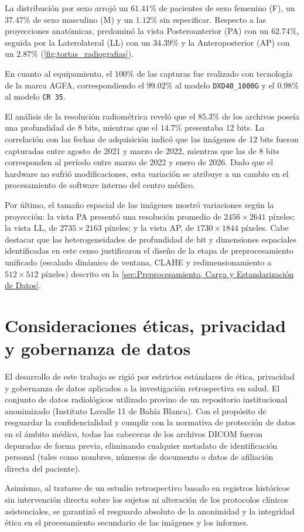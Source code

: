 \documentclass[../tesis.tex]{subfiles}
\begin{document}
La distribución por sexo arrojó un $61.41\%$ de pacientes de sexo femenino (F), un $37.47\%$ de sexo masculino (M) y un $1.12\%$ sin especificar. Respecto a las proyecciones anatómicas, predominó la vista Posteroanterior (PA) con un $62.74\%$, seguida por la Laterolateral (LL) con un $34.39\%$ y la Anteroposterior (AP) con un $2.87\%$ (\autoref{fig:tortas_radiografias}).

En cuanto al equipamiento, el $100\%$ de las capturas fue realizado con tecnología de la marca AGFA, correspondiendo el $99.02\%$ al modelo \texttt{DXD40\_1000G} y el $0.98\%$ al modelo \texttt{CR 35}.

El análisis de la resolución radiométrica reveló que el $85.3\%$ de los archivos poseía una profundidad de $8$ bits, mientras que el $14.7\%$ presentaba $12$ bits. La correlación con las fechas de adquisición indicó que las imágenes de 12 bits fueron capturadas entre agosto de 2021 y marzo de 2022, mientras que las de 8 bits corresponden al período entre marzo de 2022 y enero de 2026. Dado que el hardware no sufrió modificaciones, esta variación se atribuye a un cambio en el procesamiento de software interno del centro médico.

Por último, el tamaño espacial de las imágenes mostró variaciones según la proyección: la vista PA presentó una resolución promedio de $2456 \times 2641$ píxeles; la vista LL, de $2735 \times 2163$ píxeles; y la vista AP, de $1730 \times 1844$ píxeles. Cabe destacar que las heterogeneidades de profundidad de bit y dimensiones espaciales identificadas en este censo justificaron el diseño de la etapa de preprocesamiento unificado (escalado dinámico de ventana, CLAHE y redimensionamiento a $512 \times 512$ píxeles) descrito en la \autoref{sec:Preprocesamiento, Carga y Estandarización de Datos}.

\section{Consideraciones éticas, privacidad y gobernanza de datos}
\label{sec:consideraciones_eticas}

El desarrollo de este trabajo se rigió por estrictos estándares de ética, privacidad y gobernanza de datos aplicados a la investigación retrospectiva en salud. El conjunto de datos radiológicos utilizado provino de un repositorio institucional anonimizado (Instituto Lavalle 11 de Bahía Blanca). Con el propósito de resguardar la confidencialidad y cumplir con la normativa de protección de datos en el ámbito médico, todas las cabeceras de los archivos DICOM fueron depuradas de forma previa, eliminando cualquier metadato de identificación personal (tales como nombres, números de documento o datos de afiliación directa del paciente). 

Asimismo, al tratarse de un estudio retrospectivo basado en registros históricos sin intervención directa sobre los sujetos ni alteración de los protocolos clínicos asistenciales, se garantizó el resguardo absoluto de la anonimidad y la integridad ética en el procesamiento secundario de las imágenes y los informes.
\end{document}
